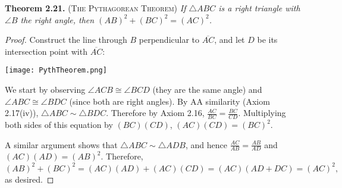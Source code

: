 \documentclass[leqno]{book}
\begin{document}
\noindent\textbf{Theorem 2.21.} \textsc{(The Pythagorean Theorem)} \emph{If $\triangle ABC$ is a right triangle with $\angle B$ the right angle, then $(AB)^2+(BC)^2=(AC)^2$.}
\begin{proof}
Construct the line through $B$ perpendicular to $\overline{AC}$, and let $D$ be its intersection point with $\overline{AC}$:
\begin{center}\texttt{[image: PythTheorem.png]}\end{center}
We start by observing $\angle ACB\cong\angle BCD$ (they are the same angle) and $\angle ABC\cong\angle BDC$ (since both are right angles).  By AA similarity (Axiom 2.17(iv)), $\triangle ABC\sim\triangle BDC$.  Therefore by Axiom 2.16, $\frac{AC}{BC}=\frac{BC}{CD}$.  Multiplying both sides of this equation by $(BC)(CD)$, $(AC)(CD)=(BC)^2$.

A similar argument shows that $\triangle ABC\sim\triangle ADB$, and hence $\frac{AC}{AB}=\frac{AB}{AD}$ and $(AC)(AD)=(AB)^2$.  Therefore,
$$(AB)^2+(BC)^2=(AC)(AD)+(AC)(CD)=(AC)(AD+DC)=(AC)^2,$$
as desired.
\end{proof}
\end{document}

